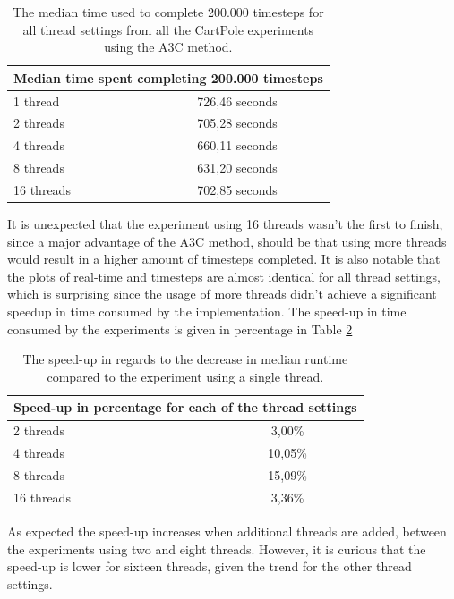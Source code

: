 \documentclass[11pt]{article}
\begin{document}
\begin{table}[H]
    \centering
 \begin{tabular}{ |l|c| }
  \hline
  \multicolumn{2}{|c|}{Median time spent completing 200.000 timesteps} \\
  \hline
  1 thread & 726,46 seconds \\
  \hline
  2 threads & 705,28 seconds \\
  \hline
  4 threads & 660,11 seconds \\
  \hline
  8 threads & 631,20 seconds \\
  \hline
  16 threads & 702,85 seconds \\
  \hline
 \end{tabular}
 \caption{The median time used to complete 200.000 timesteps
 for all thread settings from all the CartPole experiments using the A3C method.}
    \label{tab:time}
\end{table}

It is unexpected that the experiment using 16 threads wasn't the first to finish,
since a major advantage of the A3C method,
should be that using more threads would result in a higher amount of timesteps completed.
It is also notable that the plots of real-time and timesteps are almost identical
for all thread settings, which is surprising since the usage of more
threads didn't achieve a significant speedup
in time consumed by the implementation.
The speed-up in time consumed by the experiments
is given in percentage in Table \ref{tab:cp_compare}

\begin{table}[H]
    \centering
 \begin{tabular}{ |l|c| }
  \hline
  \multicolumn{2}{|c|}{Speed-up in percentage for each of the thread settings} \\
  \hline
  2 threads & 3,00\%\\
  \hline
  4 threads & 10,05\%\\
  \hline
  8 threads & 15,09\% \\
  \hline
  16 threads & 3,36\% \\
  \hline
 \end{tabular}
 \caption{The speed-up in regards to the decrease in median runtime compared to
 the experiment using a single thread.}
    \label{tab:cp_compare}
\end{table}

As expected the speed-up increases when additional threads are added, between the experiments using
two and eight threads.
However, it is curious that the speed-up is lower for sixteen threads, given the
trend for the other thread settings.
\end{document}
